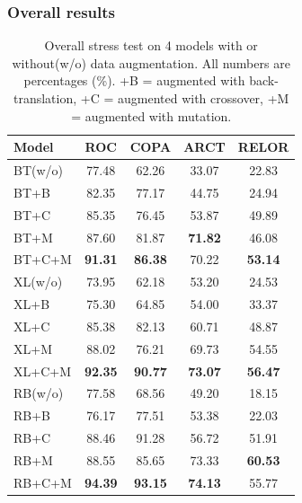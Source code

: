 \subsubsection{Overall results}
\label{sec:overview}

\begin{table}[th]
    \scriptsize
    \centering
        \begin{tabular}{l|c|c|c|c} \toprule
            \textbf{Model} &\bf{ROC} &\bf{COPA} & \bf{ARCT} & \bf{RELOR} \\ \midrule
BT(w/o)&77.48 &62.26&33.07 &22.83 \\
BT+B&82.35 &77.17 &44.75 & 24.94\\
BT+C&85.35 &76.45 &53.87 & 49.89\\
BT+M&87.60 &81.87 &\textbf{71.82} &46.08 \\
BT+C+M&\textbf{91.31}&\textbf{86.38}&70.22 &\textbf{53.14} \\
            \midrule
XL(w/o)&73.95 &62.18 &53.20 & 24.53\\
XL+B &75.30 &64.85 &54.00 & 33.37 \\
XL+C &85.38 &82.13 &60.71 & 48.87 \\
XL+M &88.02 &76.21 &69.73 & 54.55\\
XL+C+M & \textbf{92.35} &\textbf{90.77} &\textbf{73.07} & \textbf{56.47}\\
            \midrule
RB(w/o)&77.58 &68.56 &49.20 &18.15\\
RB+B &76.17 &77.51 &53.38 & 22.03\\
RB+C &88.46 &91.28 &56.72 & 51.91\\
RB+M&88.55 &85.65 &73.33 & \textbf{60.53}\\
RB+C+M &\textbf{94.39} &\textbf{93.15} &\textbf{74.13} &55.77 \\
            \bottomrule
        \end{tabular}
    \caption{\label{tab:stressresults} Overall stress test
        on 4 models with or without(w/o) data augmentation.
        All numbers are percentages (\%). 
        +B = augmented with back-translation,
        +C = augmented with crossover, +M = augmented with mutation.}
\end{table}

